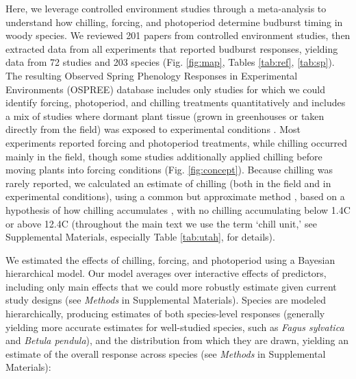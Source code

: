 \documentclass{article}
\begin{document}
\par Here, we leverage controlled environment studies through a meta-analysis to understand how chilling, forcing, and photoperiod determine budburst timing in woody species. We reviewed 201 papers from controlled environment studies, then extracted data from all experiments that reported budburst responses, yielding data from 72 studies and 203 species (Fig. \ref{fig:map}, Tables \ref{tab:ref}, \ref{tab:sp}). The resulting Observed Spring Phenology Responses in Experimental Environments (OSPREE) database includes only studies for which we could identify forcing, photoperiod, and chilling treatments quantitatively and includes a mix of studies where dormant plant tissue (grown in greenhouses or taken directly from the field) was exposed to experimental conditions \emph{\citep{wolkovich2019}}. Most experiments reported forcing and photoperiod treatments, while chilling occurred mainly in the field, though some studies additionally applied chilling before moving plants into forcing conditions (Fig. \ref{fig:concept}). Because chilling was rarely reported, we calculated an estimate of chilling (both in the field and in experimental conditions), using a common but approximate method \emph{\citep{richardson1974}}, based on a hypothesis of how chilling accumulates \citep{dennis2003}, with no chilling accumulating below 1.4\degree C or above 12.4\degree C (throughout the main text we use the term `chill unit,' see Supplemental Materials, especially Table \ref{tab:utah}, for details). 

\par We estimated the effects of chilling, forcing, and photoperiod using a Bayesian hierarchical model. Our model averages over interactive effects of predictors, including only main effects that we could more robustly estimate given current study designs (see \emph{Methods} in Supplemental Materials). Species are modeled hierarchically, producing estimates of both species-level responses (generally yielding more accurate estimates for well-studied species, such as \emph{Fagus sylvatica} and \emph{Betula pendula}), and the distribution from which they are drawn, yielding an estimate of the overall response across species (see \emph{Methods} in Supplemental Materials): 
\end{document}
